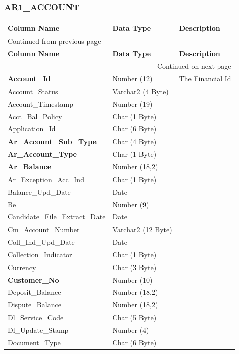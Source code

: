\documentclass[12pt,twoside]{article}
\begin{document}
\subsubsection{AR1\_ACCOUNT}
\label{sec:orgheadline87}
\footnotesize
\begin{longtable}{l|l|l}
\hline
\textbf{Column Name} & \textbf{Data Type} & \textbf{Description}\\
\hline
\endfirsthead
\multicolumn{3}{l}{Continued from previous page} \\
\hline

\textbf{Column Name} & \textbf{Data Type} & \textbf{Description} \\

\hline
\endhead
\hline\multicolumn{3}{r}{Continued on next page} \\
\endfoot
\endlastfoot
\hline
\textbf{Account\_Id} & Number (12) & The Financial Id\\
Account\_Status & Varchar2 (4 Byte) & \\
Account\_Timestamp & Number (19) & \\
Acct\_Bal\_Policy & Char (1 Byte) & \\
Application\_Id & Char (6 Byte) & \\
\textbf{Ar\_Account\_Sub\_Type} & Char (4 Byte) & \\
\textbf{Ar\_Account\_Type} & Char (1 Byte) & \\
\textbf{Ar\_Balance} & Number (18,2) & \\
Ar\_Exception\_Acc\_Ind & Char (1 Byte) & \\
Balance\_Upd\_Date & Date & \\
Be & Number (9) & \\
Candidate\_File\_Extract\_Date & Date & \\
Cm\_Account\_Number & Varchar2 (12 Byte) & \\
Coll\_Ind\_Upd\_Date & Date & \\
Collection\_Indicator & Char (1 Byte) & \\
Currency & Char (3 Byte) & \\
\textbf{Customer\_No} & Number (10) & \\
Deposit\_Balance & Number (18,2) & \\
Dispute\_Balance & Number (18,2) & \\
Dl\_Service\_Code & Char (5 Byte) & \\
Dl\_Update\_Stamp & Number (4) & \\
Document\_Type & Char (6 Byte) & \\

\end{longtable}
\end{document}
